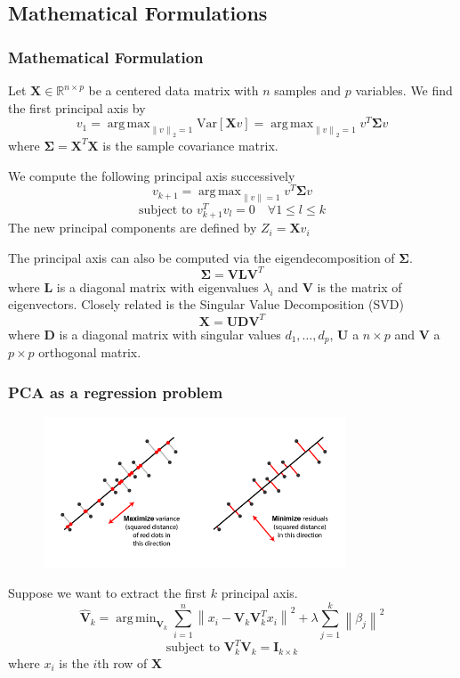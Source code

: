 \documentclass{beamer}
\theoremstyle{plain}
\theoremstyle{definition}
\newcommand{\mat}[1]{\mathbf{#1}}
\DeclareMathOperator*{\argmax}{arg\,max}
\DeclareMathOperator*{\argmin}{arg\,min}
\newcommand{\norm}[1]{\left\lVert #1 \right\rVert}
\begin{document}
\subsection{Mathematical Formulations}
\begin{frame}
\frametitle{Mathematical Formulation}
Let $\mat X \in \mathbb{R}^{n \times p}$ be a centered data matrix with $n$ samples and $p$ variables. We find the first principal axis by 
$$v_1 = \argmax_{\norm{v}_2 = 1} \text{Var}[\mat{X}v] = \argmax_{\norm{v}_2 = 1} v^T \mat{\Sigma} v$$
where $\mat{\Sigma} = \mat X^T \mat X$ is the sample covariance matrix.

We compute the following principal axis successively
$$v_{k+1} = \argmax_{\norm{v} = 1} v^T \mat{\Sigma} v$$ 
$$\text{subject to }v_{k+1}^Tv_l = 0 \quad \forall 1 \leq l \leq k$$
The new principal components are defined by $Z_i = \mat{X}v_i$

\end{frame}

\begin{frame}
The principal axis can also be computed via the eigendecomposition of $\mat{\Sigma}$.
$$\mat{\Sigma} = \mat V \mat L \mat{V}^T$$
where $\mat{L}$ is a diagonal matrix with eigenvalues $\lambda_i$ and $\mat V$ is the matrix of eigenvectors.
Closely related is the Singular Value Decomposition (SVD) 
$$ \mat{X} = \mat{U}\mat{D}\mat{V}^T $$
where $\mat{D}$ is a diagonal matrix with singular values $d_1,\ldots,d_p$, $\mat{U}$ a $n \times p$ and $\mat{V}$ a $p \times p$ orthogonal matrix.
\end{frame}

\begin{frame}
\frametitle{PCA as a regression problem}
\begin{figure}
\centering
\includegraphics[width = 0.8\textwidth]{figures/pca_projection_explanation.png}
\label{pca_projection_explanation}
\end{figure}
Suppose we want to extract the first $k$ principal axis.
$$\mat{\hat{V}}_k = \argmin_{\mat{V}_k} \sum_{i=1}^{n} \norm{x_i - \mat{V}_k \mat{V}_k^Tx_i}^2 + \lambda \sum_{j=1}^{k}\norm{\beta_j}^2$$
$$\text{subject to }\mat{V}_k^T\mat{V}_k = \mat{I}_{k \times k}$$
where $x_i$ is the $i$th row of $\mat X$
\end{frame}
\end{document}
